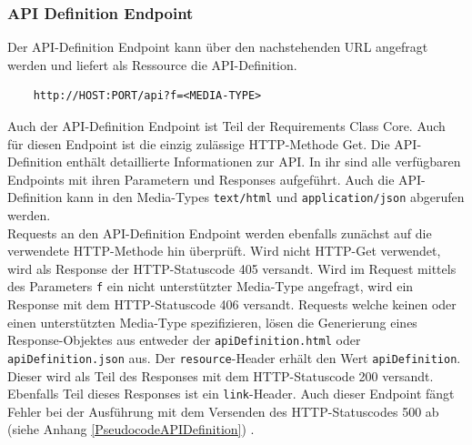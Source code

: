 \subsubsection{API Definition Endpoint}
Der API-Definition Endpoint kann über den nachstehenden URL angefragt werden und liefert als Ressource die API-Definition. 
\begin{center}
\begin{BVerbatim}
    http://HOST:PORT/api?f=<MEDIA-TYPE>
\end{BVerbatim}
\end{center}
Auch der API-Definition Endpoint ist Teil der Requirements Class Core.
Auch für diesen Endpoint ist die einzig zulässige HTTP-Methode Get. 
Die API-Definition enthält detaillierte Informationen zur API. In ihr sind alle verfügbaren Endpoints mit ihren Parametern und Responses aufgeführt. 
Auch die API-Definition kann in den Media-Types \verb|text/html| und \verb|application/json| abgerufen werden.\\
   
Requests an den API-Definition Endpoint werden ebenfalls zunächst auf die verwendete HTTP-Methode hin überprüft. Wird nicht HTTP-Get verwendet, wird als 
Response der HTTP-Statuscode 405 versandt. Wird im Request mittels des Parameters \verb|f| ein nicht unterstützter Media-Type angefragt, wird ein Response 
mit dem HTTP-Statuscode 406 versandt. 
Requests welche keinen oder einen unterstützten Media-Type spezifizieren, lösen die Generierung eines Response-Objektes aus entweder der \verb|apiDefinition.html| oder 
\verb|apiDefinition.json| aus. Der \verb|resource|-Header erhält den Wert \verb|apiDefinition|. Dieser wird als Teil des Responses mit dem HTTP-Statuscode 200 versandt.
Ebenfalls Teil dieses Responses ist ein \verb|link|-Header. Auch dieser Endpoint fängt Fehler bei der
Ausführung mit dem Versenden des HTTP-Statuscodes 500 ab (siehe Anhang \ref{PseudocodeAPIDefinition}) 
\cite{code,ogc_api_processes_core}. 

